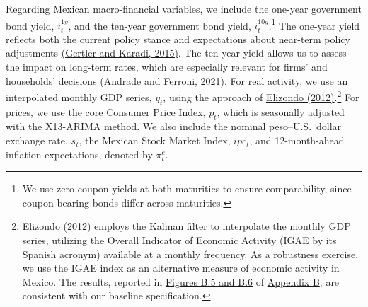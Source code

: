 \documentclass[\latexroot/\projectname]{subfiles}
\begin{document}
Regarding Mexican macro-financial variables, we include the one-year government bond yield, $i_t^{1y}$, and the ten-year government bond yield, $i_t^{10y}$.\footnote{We use zero-coupon yields at both maturities to ensure comparability, since coupon-bearing bonds differ across maturities.} The one-year yield reflects both the current policy stance and expectations about near-term policy adjustments \hyperlink{Gertler and Karadi (2015)}{(Gertler and Karadi, 2015)}. The ten-year yield allows us to assess the impact on long-term rates, which are especially relevant for firms’ and households’ decisions \hyperlink{Andrade and Ferroni (2021)}{(Andrade and Ferroni, 2021)}. For real activity, we use an interpolated monthly GDP series, $y_t$, using the approach of \hyperlink{Elizondo (2012)}{Elizondo (2012)}.\footnote{\hyperlink{Elizondo (2012)}{Elizondo (2012)} employs the Kalman filter to interpolate the monthly GDP series, utilizing the Overall Indicator of Economic Activity (IGAE  by  its  Spanish  acronym) available at a monthly frequency. As a robustness exercise, we use the IGAE index as an alternative
measure of economic activity in Mexico. The results, reported in \hyperlink{Figure B.5}{Figures B.5 and B.6} of \hyperlink{Appendix B}{Appendix B}, are consistent with our baseline specification.} For prices, we use the core Consumer Price Index, $p_t$, which is seasonally adjusted with the X13-ARIMA method. We also include the nominal peso--U.S.\ dollar exchange rate, $s_t$, the Mexican Stock Market Index, $ipc_t$, and 12-month-ahead inflation expectations, denoted by $\pi^{e}_{t}$.
\end{document}
